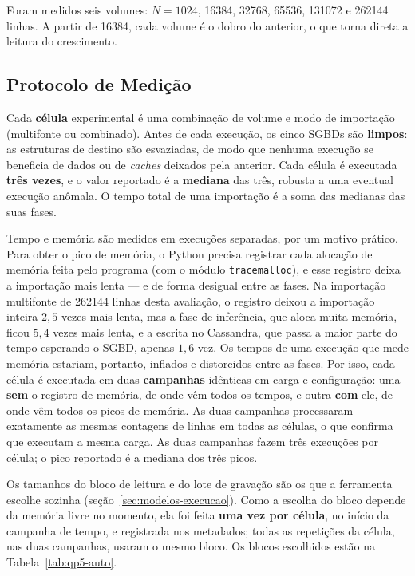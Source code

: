 Foram medidos seis volumes: $N = \num{1024}$, \num{16384}, \num{32768}, \num{65536},
\num{131072} e \num{262144} linhas. A partir de \num{16384}, cada volume é o dobro do
anterior, o que torna direta a leitura do crescimento.

\subsection{Protocolo de Medição}
\label{sec:protocolo-medicao}

Cada \textbf{célula} experimental é uma combinação de volume e modo de importação
(multifonte ou combinado). Antes de cada execução, os cinco SGBDs são \textbf{limpos}: as
estruturas de destino são esvaziadas, de modo que nenhuma execução se beneficia de dados ou
de \textit{caches} deixados pela anterior. Cada célula é executada \textbf{três vezes}, e o
valor reportado é a \textbf{mediana} das três, robusta a uma eventual execução anômala. O
tempo total de uma importação é a soma das medianas das suas fases.

Tempo e memória são medidos em execuções separadas, por um motivo prático. Para obter o
pico de memória, o Python precisa registrar cada alocação de memória feita pelo programa
(com o módulo \texttt{tracemalloc}), e esse registro deixa a importação mais lenta --- e de
forma desigual entre as fases. Na importação multifonte de \num{262144} linhas desta
avaliação, o registro deixou a importação inteira $2{,}5$ vezes mais lenta, mas a fase de
inferência, que aloca muita memória, ficou $5{,}4$ vezes mais lenta, e a escrita no
Cassandra, que passa a maior parte do tempo esperando o SGBD, apenas $1{,}6$ vez. Os tempos de uma
execução que mede memória estariam, portanto, inflados e distorcidos entre as fases. Por
isso, cada célula é executada em duas \textbf{campanhas} idênticas em carga e configuração:
uma \textbf{sem} o registro de memória, de onde vêm todos os tempos, e outra \textbf{com}
ele, de onde vêm todos os picos de memória. As duas campanhas processaram exatamente as
mesmas contagens de linhas em todas as células, o que confirma que executam a mesma carga.
As duas campanhas fazem três execuções por célula; o pico reportado é a mediana dos três
picos.

Os tamanhos do bloco de leitura e do lote de gravação são os que a ferramenta escolhe
sozinha (seção~\ref{sec:modelos-execucao}). Como a escolha do bloco depende da memória livre
no momento, ela foi feita \textbf{uma vez por célula}, no início da campanha de tempo, e
registrada nos metadados; todas as repetições da célula, nas duas campanhas, usaram o mesmo
bloco. Os blocos escolhidos estão na Tabela~\ref{tab:qp5-auto}.

